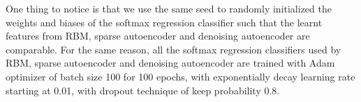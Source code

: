 One thing to notice is that we use the same seed to randomly initialized the weights and biases
of the softmax regression classifier such that the learnt features from RBM, sparse autoencoder and
denoising autoencoder are comparable.
For the same reason, all the softmax regression classifiers used by RBM, sparse autoencoder and
denoising autoencoder are trained with Adam optimizer of batch size 100 for 100 epochs,
with exponentially decay learning rate starting at 0.01,
with dropout technique of keep probability 0.8.

